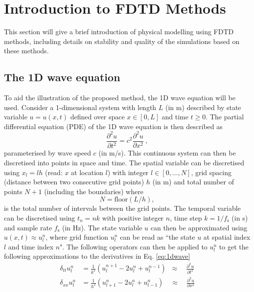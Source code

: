 \documentclass[dvipsnames, preprint]{JASA}
\begin{document}
\section{\label{sec:FDTD} Introduction to FDTD Methods}
This section will give a brief introduction of physical modelling using FDTD methods, including details on stability and quality of the simulations based on these methods.


\subsection{The 1D wave equation}
To aid the illustration of the proposed method, the 1D wave equation will be used. 
Consider a 1-dimensional system with length $L$ (in m) described by state variable $u = u(x, t)$ defined over space $x \in [0, L]$ and time $t \geq 0$. The partial differential equation (PDE) of the 1D wave equation is then described as
\begin{equation}\label{eq:1dwave}
    \frac{\partial^2 u}{\partial t^2}= c^2\frac{\partial^2 u}{\partial x^2}\ ,
\end{equation}
parameterised by wave speed $c$ (in m/s).
This continuous system can then be discretised into points in space and time. The spatial variable can be discretised using $x_l = lh$ (read: $x$ at location $l$) with integer $l \in [0, \hdots, N]$, grid spacing (distance between two consecutive grid points) $h$ (in m) and total number of points $N + 1$ (including the boundaries) where
\begin{equation}\label{eq:numberOfPoints}
    N = \text{floor}(L/h),
\end{equation}
is the total number of intervals between the grid points. The temporal variable can be discretised using $t_n = nk$ with positive integer $n$, time step $k = 1/f_\text{s}$ (in s) and sample rate $f_\text{s}$ (in Hz). The state variable $u$ can then be approximated using $u(x,t) \approx u_l^n$, where grid function $u_l^n$ can be read as ``the state $u$ at spatial index $l$ and time index $n$".
%
The following operators can then be applied to $u_l^n$ to get the following approximations to the derivatives in Eq. \eqref{eq:1dwave}
\begin{subequations}\label{eq:operators}
    \begin{align}
         \delta_{tt}u_l^n &= \frac{1}{k^2}\left(u_l^{n+1}-2u_l^n + u_l^{n-1}\right)\;\;\approx\quad\frac{\partial^2u}{\partial t^2}\label{eq:secondOrderTime}\\
         \delta_{xx}u_l^n &= \frac{1}{h^2}\left(u_{l+1}^n-2u_l^n + u_{l-1}^n\right)\quad\approx\quad \frac{\partial^2u}{\partial x^2}\label{eq:secondOrderSpace}
    \end{align}
\end{subequations}
\end{document}

